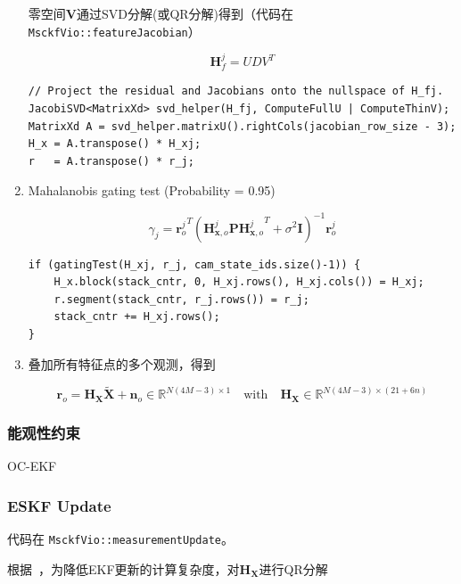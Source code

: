 \documentclass[12pt,a4paper]{article}
\begin{document}
\begin{enumerate}
零空间$\mathbf{V}$通过SVD分解(或QR分解)得到（代码在 \verb|MsckfVio::featureJacobian|）

$$
\mathbf{H}_f^j = UDV^T
$$

\begin{lstlisting}
// Project the residual and Jacobians onto the nullspace of H_fj.
JacobiSVD<MatrixXd> svd_helper(H_fj, ComputeFullU | ComputeThinV);
MatrixXd A = svd_helper.matrixU().rightCols(jacobian_row_size - 3);
H_x = A.transpose() * H_xj;
r   = A.transpose() * r_j;
\end{lstlisting}

\item Mahalanobis gating test (Probability = 0.95)

$$
{\gamma}_j = 
{\mathbf{r}^j_o }^T 
(\mathbf{H}_{\mathbf{x}, o}^j \mathbf{P} {\mathbf{H}_{\mathbf{x}, o}^j}^T + 
{\sigma}^2 \mathbf{I})^{-1} 
\mathbf{r}^j_o 
$$

\begin{lstlisting}
if (gatingTest(H_xj, r_j, cam_state_ids.size()-1)) {
	H_x.block(stack_cntr, 0, H_xj.rows(), H_xj.cols()) = H_xj;
	r.segment(stack_cntr, r_j.rows()) = r_j;
	stack_cntr += H_xj.rows();
}
\end{lstlisting}

\item 叠加所有特征点的多个观测，得到

\begin{equation}
\label{equ:visual_residual_final}
\mathbf{r}_{o}=\mathbf{H}_{\mathbf{X}} \widetilde{\mathbf{X}}+\mathbf{n}_{o}
\in \mathbb{R}^{N(4M-3) \times 1}
\quad \text{with} \quad
\mathbf{H}_{\mathbf{X}} \in \mathbb{R}^{N(4M-3) \times (21+6n)}
\end{equation}


\end{enumerate}


\subsubsection{能观性约束}

OC-EKF


\subsubsection{ESKF Update}

代码在 \verb|MsckfVio::measurementUpdate|。

根据~\cite{mourikis2007multi}，为降低EKF更新的计算复杂度，对$\mathbf{H}_{\mathbf{X}}$进行QR分解
\end{document}

